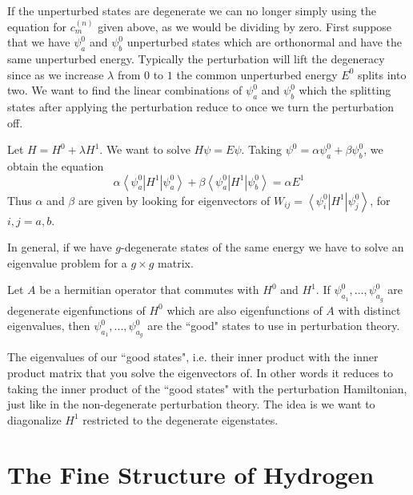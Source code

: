 \documentclass[12pt, a4paper, oneside, openright, titlepage]{book}
\newcommand{\bra}[1]{\left\langle#1\right\vert}
\newcommand{\ket}[1]{\left\vert#1\right\rangle}
\begin{document}
If the unperturbed states are degenerate we can no longer simply using the equation for $c_m^{(n)}$ given above, as we would be dividing by zero. First suppose that we have $\psi_a^0$ and $\psi_b^0$ unperturbed states which are orthonormal and have the same unperturbed energy. Typically the perturbation will lift the degeneracy since as we increase $\lambda$ from $0$ to $1$ the common unperturbed energy $E^0$ splits into two. We want to find the linear combinations of $\psi_a^0$ and $\psi_b^0$ which the splitting states after applying the perturbation reduce to once we turn the perturbation off.

Let $H = H^0+\lambda H^1$. We want to solve $H\psi = E\psi$. Taking $\psi^0 = \alpha\psi_a^0+\beta\psi_b^0$, we obtain the equation $$\alpha\bra{\psi_a^0}H^1\ket{\psi_a^0} + \beta\bra{\psi_a^0}H^1\ket{\psi_b^0} = \alpha E^1$$
Thus $\alpha$ and $\beta$ are given by looking for eigenvectors of $W_{ij} = \bra{\psi_i^0}H^1\ket{\psi_j^0}$, for $i,j = a,b$.

In general, if we have $g$-degenerate states of the same energy we have to solve an eigenvalue problem for a $g\times g$ matrix.

\begin{thm}
    Let $A$ be a hermitian operator that commutes with $H^0$ and $H^1$. If $\psi_{a_1}^0,...,\psi_{a_g}^0$ are degenerate eigenfunctions of $H^0$ which are also eigenfunctions of $A$ with distinct eigenvalues, then $\psi_{a_1}^0,...,\psi_{a_g}^0$ are the ``good" states to use in perturbation theory.
\end{thm}

The eigenvalues of our ``good states", i.e. their inner product with the inner product matrix that you solve the eigenvectors of. In other words it reduces to taking the inner product of the ``good states" with the perturbation Hamiltonian, just like in the non-degenerate perturbation theory. The idea is we want to diagonalize $H^1$ restricted to the degenerate eigenstates.



\section{The Fine Structure of Hydrogen}
\end{document}
